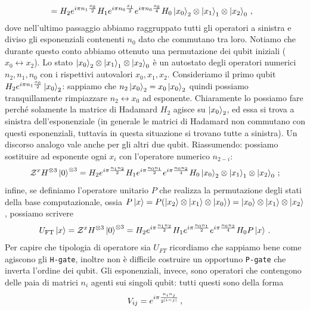\begin{esempio}
\begin{align*}
    &= H_2e^{i\pi n_1 \frac{x_0}{2}}H_1e^{i\pi n_0\frac{x_1}{2}}e^{i\pi n_0 \frac{x_0}{4}}H_0\ket{x_0}_2 \otimes \ket{x_1}_1 \otimes \ket{x_2}_0 \, ,
\end{align*}
dove nell'ultimo passaggio abbiamo raggruppato tutti gli operatori a sinistra e diviso gli esponenziali contenenti $n_0$ dato che commutano tra loro. Notiamo che durante questo conto abbiamo ottenuto una permutazione dei qubit iniziali ($x_0 \leftrightarrow x_2$). Lo stato $\ket{x_0}_2 \otimes \ket{x_1}_1 \otimes \ket{x_2}_0$ è un autostato degli operatori numerici $n_2, n_1, n_0$ con i rispettivi autovalori $x_0, x_1, x_2$. Consideriamo il primo qubit $H_2 e^{i \pi n_1 \frac{x_0}{2}} \ket{x_0}_2$: sappiamo che $n_2 \ket{x_0}_2 = x_0 \ket{x_0}_2$ quindi possiamo tranquillamente rimpiazzare $n_2 \leftrightarrow x_0$ ad esponente. Chiaramente lo possiamo fare perché solamente la matrice di Hadamard $H_2$ agisce su $\ket{x_0}_2$, ed essa si trova a sinistra dell'esponenziale (in generale le matrici di Hadamard non commutano con questi esponenziali, tuttavia in questa situazione si trovano tutte a sinistra). Un discorso analogo vale anche per gli altri due qubit. Riassumendo: possiamo sostituire ad esponente ogni $x_i$ con l'operatore numerico $n_{2-i}$:
\begin{equation*}
    \mathcal{Z}^xH^{\otimes 3}\ket{0}^{\otimes 3} = H_2 e^{i\pi \frac{n_1 n_2}{2}} H_1 e^{i\pi \frac{n_0 n_1}{2}} e^{i\pi \frac{n_0 n_2}{4}} H_0 \ket{x_0}_2 \otimes \ket{x_1}_1 \otimes \ket {x_2}_0 \, ;
\end{equation*}
infine, se definiamo l'operatore unitario $P$ che realizza la permutazione degli stati della base computazionale, ossia $ P \ket{x} = P \! \left( \ket{x_2} \otimes \ket{x_1} \otimes \ket {x_0} \right) = \ket{x_0} \otimes \ket{x_1} \otimes \ket {x_2}$, possiamo scrivere
\begin{equation*}
    U_{\text{FT}}\ket x = \mathcal{Z}^xH^{\otimes 3}\ket{0}^{\otimes 3} = H_2 e^{i\pi \frac{n_1 n_2}{2}} H_1 e^{i \pi \frac{n_0 n_1}{2}} e^{i \pi \frac{n_0 n_2}{4}} H_0 P \ket{x} \, .
\end{equation*}
Per capire che tipologia di operatore sia $U_{FT}$ ricordiamo che sappiamo bene come agiscono gli \texttt{H-gate}, inoltre non è difficile costruire un opportuno \texttt{P-gate} che inverta l'ordine dei qubit. Gli esponenziali, invece, sono operatori che contengono delle paia di matrici $n_i$ agenti sui singoli qubit: tutti questi sono della forma 
\begin{equation*}
V_{ij} = e^{i \pi \frac{n_i n_j}{2^{\abs{i-j}}}} \, ,

\end{equation*}
\end{esempio}
